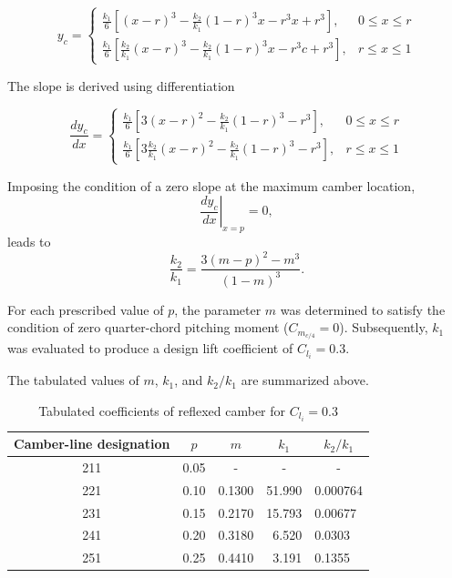 \begin{equation}
y_c =
    \begin{cases}
        \displaystyle \frac{k_1}{6}\left[(x - r)^3 - \frac{k_2}{k_1}(1-r)^3x - r^3x + r^3\right], & 0\leq x\leq r \\[15pt]
        \displaystyle \frac{k_1}{6}\left[\frac{k_2}{k_1}\left(x - r\right)^3 - \frac{k_2}{k_1}(1-r)^3x - r^3c + r^3\right],& r\leq x \leq 1 
    \end{cases}
\end{equation}

The slope is derived using differentiation 

\begin{equation}
\frac{dy_c}{dx} =
    \begin{cases}
        \displaystyle \frac{k_1}{6}\left[3(x - r)^2 - \frac{k_2}{k_1}(1-r)^3 - r^3\right], & 0\leq  x\leq r \\[15pt]
        \displaystyle \frac{k_1}{6}\left[3\frac{k_2}{k_1}\left(x - r\right)^2 - \frac{k_2}{k_1}(1-r)^3 - r^3\right], & r\leq \displaystyle x \leq 1 
    \end{cases}
\end{equation}

Imposing the condition of a zero slope at the maximum camber location,
\[
\left.
\frac{dy_c}{dx}
\right|_{x = p}
= 0,
\]
leads to
\[
\frac{k_2}{k_1}
=
\frac{
3(m-p)^2 - m^3
}{
(1-m)^3
}.
\]

For each prescribed value of $p$, the parameter $m$ was determined 
to satisfy the condition of zero quarter-chord pitching moment 
($C_{m_{c/4}} = 0$). 
Subsequently, 
$k_1$ was evaluated to produce a design lift coefficient of $C_{l_i} = 0.3$.

The tabulated values of $m$, $k_1$, and $k_2/k_1$ 
are summarized above.

\begin{table}[h!]
\centering
    \begin{tabular}{|c|c|c|r|l|}
        \hline
        Camber-line designation & $p$ & $m$ & \multicolumn{1}{c|}{$k_1$} & \multicolumn{1}{c|}{$k_2/k_1$}  \\
        \hline
        211 & 0.05 & - & \multicolumn{1}{c|}{-} & \multicolumn{1}{c|}{-} \\
        221 & 0.10 & 0.1300 & 51.990 & 0.000764 \\
        231 & 0.15 & 0.2170 & 15.793 & 0.00677 \\
        241 & 0.20 & 0.3180 & 6.520 & 0.0303 \\
        251 & 0.25 & 0.4410 & 3.191 & 0.1355 \\
        \hline
    \end{tabular}
    \caption{Tabulated coefficients of reflexed camber for $C_{l_i}=0.3$}
\end{table}

